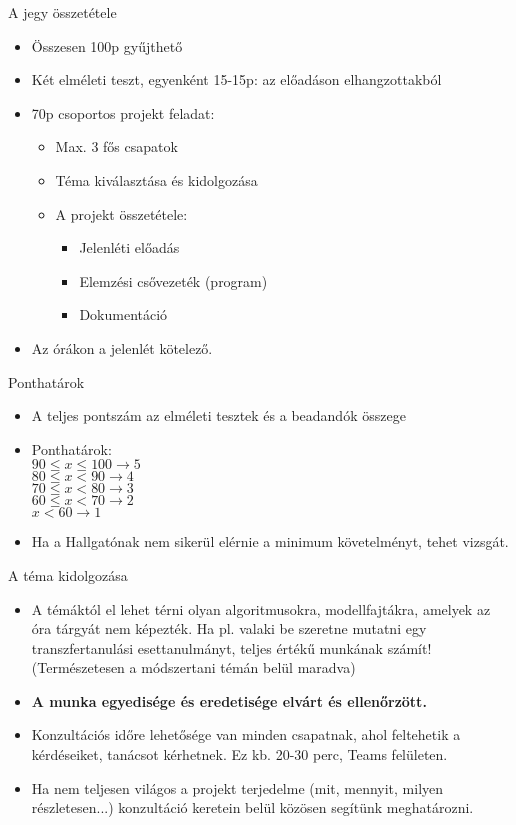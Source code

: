 \documentclass[english, aspectratio=169]{beamer}
\begin{document}
\begin{frame}{A jegy összetétele}
\begin{itemize}
	\item Összesen 100p gyűjthető
	\item Két elméleti teszt, egyenként 15-15p: az előadáson elhangzottakból
	\item 70p csoportos projekt feladat:
	\begin{itemize}
		\item Max. 3 fős csapatok
		\item Téma kiválasztása és kidolgozása
		\item A projekt összetétele:
		\begin{itemize}
			\item Jelenléti előadás
			\item Elemzési csővezeték (program)
			\item Dokumentáció
		\end{itemize}
	\end{itemize}
	\item Az órákon a jelenlét kötelező. 
\end{itemize}
\end{frame}

\begin{frame}{Ponthatárok}
\begin{itemize}
	\item A teljes pontszám az elméleti tesztek és a beadandók összege
	\item Ponthatárok:\\
	$90 \leq x \leq 100 \rightarrow 5$\\
	$80 \leq x < 90 \rightarrow 4$\\
	$70 \leq x < 80 \rightarrow 3$\\
	$60 \leq x < 70 \rightarrow 2$\\
	$x < 60 \rightarrow 1$
	\item Ha a Hallgatónak nem sikerül elérnie a minimum követelményt, tehet vizsgát.
\end{itemize}
\end{frame}

\begin{frame}{A téma kidolgozása}
\begin{itemize}
	\item A témáktól el lehet térni olyan algoritmusokra, modellfajtákra, amelyek az óra tárgyát nem képezték. Ha pl. valaki be szeretne mutatni egy transzfertanulási esettanulmányt, teljes értékű munkának számít! (Természetesen a módszertani témán belül maradva)
	\item \textbf{A munka egyedisége és eredetisége elvárt és ellenőrzött.}
	\item Konzultációs időre lehetősége van minden csapatnak, ahol feltehetik a kérdéseiket, tanácsot kérhetnek. Ez kb. 20-30 perc, Teams felületen.
	\item Ha nem teljesen világos a projekt terjedelme (mit, mennyit, milyen részletesen...) konzultáció keretein belül közösen segítünk meghatározni.
\end{itemize}
\end{frame}
\end{document}
